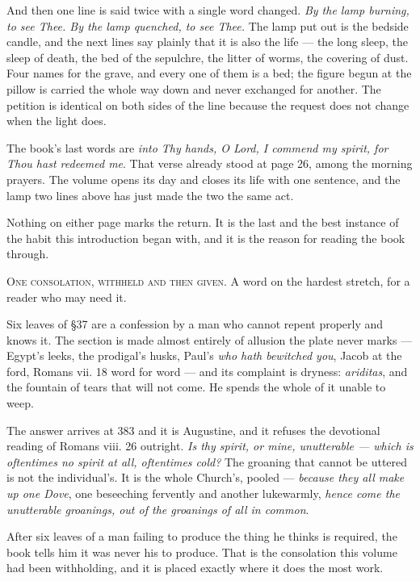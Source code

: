 And then one line is said twice with a single word changed. \emph{By the lamp
burning, to see Thee. By the lamp quenched, to see Thee.} The lamp put out is the
bedside candle, and the next lines say plainly that it is also the life --- the
long sleep, the sleep of death, the bed of the sepulchre, the litter of worms, the
covering of dust. Four names for the grave, and every one of them is a bed; the
figure begun at the pillow is carried the whole way down and never exchanged for
another. The petition is identical on both sides of the line because the request
does not change when the light does.

The book's last words are \emph{into Thy hands, O Lord, I commend my spirit, for
Thou hast redeemed me}. That verse already stood at page 26, among the morning
prayers. The volume opens its day and closes its life with one sentence, and the
lamp two lines above has just made the two the same act.

Nothing on either page marks the return. It is the last and the best instance of
the habit this introduction began with, and it is the reason for reading the book
through.

\vspace{0.8\baselineskip}
{\scshape One consolation, withheld and then given.}\quad
A word on the hardest stretch, for a reader who may need it.

Six leaves of §37 are a confession by a man who cannot repent properly and knows
it. The section is made almost entirely of allusion the plate never marks ---
Egypt's leeks, the prodigal's husks, Paul's \emph{who hath bewitched you}, Jacob at
the ford, Romans vii. 18 word for word --- and its complaint is dryness:
\emph{ariditas}, and the fountain of tears that will not come. He spends the whole
of it unable to weep.

The answer arrives at 383 and it is Augustine, and it refuses the devotional
reading of Romans viii. 26 outright. \emph{Is thy spirit, or mine, unutterable ---
which is oftentimes no spirit at all, oftentimes cold?} The groaning that cannot be
uttered is not the individual's. It is the whole Church's, pooled --- \emph{because
they all make up one Dove}, one beseeching fervently and another lukewarmly,
\emph{hence come the unutterable groanings, out of the groanings of all in common}.

After six leaves of a man failing to produce the thing he thinks is required, the
book tells him it was never his to produce. That is the consolation this volume had
been withholding, and it is placed exactly where it does the most work.

\endgroup
\clearpage
